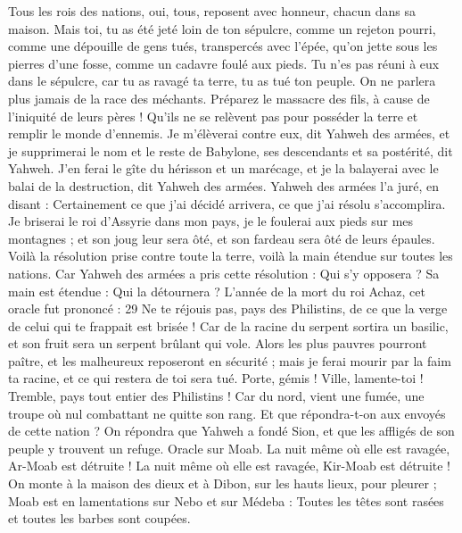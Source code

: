\begin{multicols}{2}
Tous les rois des nations, oui, tous, reposent avec honneur, chacun dans sa maison.
Mais toi, tu as été jeté loin de ton sépulcre, comme un rejeton pourri, comme une dépouille de gens tués, transpercés avec l'épée, qu'on jette sous les pierres d'une fosse, comme un cadavre foulé aux pieds.
Tu n'es pas réuni à eux dans le sépulcre, car tu as ravagé ta terre, tu as tué ton peuple. On ne parlera plus jamais de la race des méchants.
Préparez le massacre des fils, à cause de l'iniquité de leurs pères ! Qu'ils ne se relèvent pas pour posséder la terre et remplir le monde d'ennemis.
Je m'élèverai contre eux, dit Yahweh des armées, et je supprimerai le nom et le reste de Babylone, ses descendants et sa postérité, dit Yahweh.
J'en ferai le gîte du hérisson et un marécage, et je la balayerai avec le balai de la destruction, dit Yahweh des armées.
Yahweh des armées l'a juré, en disant : Certainement ce que j'ai décidé arrivera, ce que j'ai résolu s'accomplira.
Je briserai le roi d'Assyrie dans mon pays, je le foulerai aux pieds sur mes montagnes ; et son joug leur sera ôté, et son fardeau sera ôté de leurs épaules.
Voilà la résolution prise contre toute la terre, voilà la main étendue sur toutes les nations.
Car Yahweh des armées a pris cette résolution : Qui s'y opposera ? Sa main est étendue : Qui la détournera ?
L'année de la mort du roi Achaz, cet oracle fut prononcé : 29 Ne te réjouis pas, pays des Philistins, de ce que la verge de celui qui te frappait est brisée ! Car de la racine du serpent sortira un basilic, et son fruit sera un serpent brûlant qui vole.
Alors les plus pauvres pourront paître, et les malheureux reposeront en sécurité ; mais je ferai mourir par la faim ta racine, et ce qui restera de toi sera tué.
Porte, gémis ! Ville, lamente-toi ! Tremble, pays tout entier des Philistins ! Car du nord, vient une fumée, une troupe où nul combattant ne quitte son rang.
Et que répondra-t-on aux envoyés de cette nation ? On répondra que Yahweh a fondé Sion, et que les affligés de son peuple y trouvent un refuge.
\VerseOne{}Oracle sur Moab. La nuit même où elle est ravagée, Ar-Moab est détruite ! La nuit même où elle est ravagée, Kir-Moab est détruite !
On monte à la maison des dieux et à Dibon, sur les hauts lieux, pour pleurer ; Moab est en lamentations sur Nebo et sur Médeba : Toutes les têtes sont rasées et toutes les barbes sont coupées.

\end{multicols}
